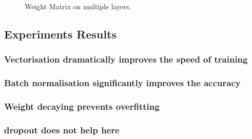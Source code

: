 \begin{figure}
    \caption{\label{fig:my-label}Weight Matrix on multiple layers.}
\end{figure}


\subsection{Experiments Results}
\subsubsection{Vectorisation dramatically improves the speed of training}
\subsubsection{Batch normalisation significantly improves the accuracy}
\subsubsection{Weight decaying prevents overfitting}
\subsubsection{dropout does not help here}
